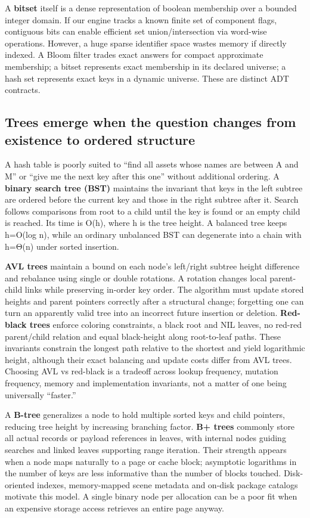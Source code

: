 A \textbf{bitset} itself is a dense representation of boolean membership over a bounded integer domain. If our engine tracks a known finite set of component flags, contiguous bits can enable efficient set union/intersection via word-wise operations. However, a huge sparse identifier space wastes memory if directly indexed. A Bloom filter trades exact answers for compact approximate membership; a bitset represents exact membership in its declared universe; a hash set represents exact keys in a dynamic universe. These are distinct ADT contracts.

\subsection{Trees emerge when the question changes from existence to ordered structure}\label{05-engine-i-ch007-trees-emerge-when-the-question-changes-from-existence-to-ordered-structure}

A hash table is poorly suited to ``find all assets whose names are between A and M'' or ``give me the next key after this one'' without additional ordering. A \textbf{binary search tree (BST)} maintains the invariant that keys in the left subtree are ordered before the current key and those in the right subtree after it. Search follows comparisons from root to a child until the key is found or an empty child is reached. Its time is O(h), where h is the tree height. A balanced tree keeps h=O(log n), while an ordinary unbalanced BST can degenerate into a chain with h=Θ(n) under sorted insertion.

\textbf{AVL trees} maintain a bound on each node's left/right subtree height difference and rebalance using single or double rotations. A rotation changes local parent-child links while preserving in-order key order. The algorithm must update stored heights and parent pointers correctly after a structural change; forgetting one can turn an apparently valid tree into an incorrect future insertion or deletion. \textbf{Red-black trees} enforce coloring constraints, a black root and NIL leaves, no red-red parent/child relation and equal black-height along root-to-leaf paths. These invariants constrain the longest path relative to the shortest and yield logarithmic height, although their exact balancing and update costs differ from AVL trees. Choosing AVL vs red-black is a tradeoff across lookup frequency, mutation frequency, memory and implementation invariants, not a matter of one being universally ``faster.''

A \textbf{B-tree} generalizes a node to hold multiple sorted keys and child pointers, reducing tree height by increasing branching factor. \textbf{B+ trees} commonly store all actual records or payload references in leaves, with internal nodes guiding searches and linked leaves supporting range iteration. Their strength appears when a node maps naturally to a page or cache block; asymptotic logarithms in the number of keys are less informative than the number of blocks touched. Disk-oriented indexes, memory-mapped scene metadata and on-disk package catalogs motivate this model. A single binary node per allocation can be a poor fit when an expensive storage access retrieves an entire page anyway.

